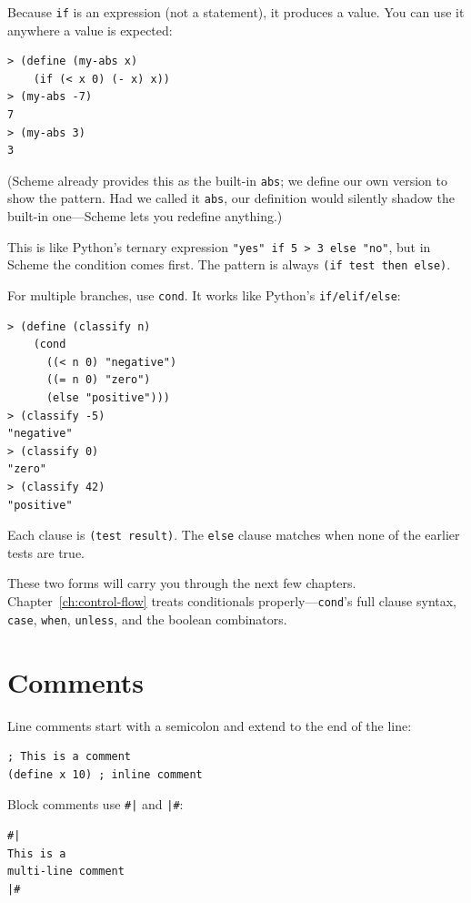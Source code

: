 Because \texttt{if} is an expression (not a statement), it produces a value. You can use it anywhere a value is expected:

\begin{lstlisting}[style=repl]
> (define (my-abs x)
    (if (< x 0) (- x) x))
> (my-abs -7)
7
> (my-abs 3)
3
\end{lstlisting}

(Scheme already provides this as the built-in \texttt{abs}; we define our own version to show the pattern. Had we called it \texttt{abs}, our definition would silently shadow the built-in one---Scheme lets you redefine anything.)

\begin{note}
This is like Python's ternary expression \texttt{"yes" if 5 > 3 else "no"}, but in Scheme the condition comes first. The pattern is always \texttt{(if test then else)}.
\end{note}

For multiple branches, use \texttt{cond}. It works like Python's \texttt{if/elif/else}:

\begin{lstlisting}[style=repl]
> (define (classify n)
    (cond
      ((< n 0) "negative")
      ((= n 0) "zero")
      (else "positive")))
> (classify -5)
"negative"
> (classify 0)
"zero"
> (classify 42)
"positive"
\end{lstlisting}

Each clause is \texttt{(test result)}. The \texttt{else} clause matches when none of the earlier tests are true.

These two forms will carry you through the next few chapters. Chapter~\ref{ch:control-flow} treats conditionals properly---\texttt{cond}'s full clause syntax, \texttt{case}, \texttt{when}, \texttt{unless}, and the boolean combinators.

\section{Comments}

Line comments start with a semicolon and extend to the end of the line:

\begin{lstlisting}
; This is a comment
(define x 10) ; inline comment
\end{lstlisting}

Block comments use \texttt{\#|} and \texttt{|\#}:

\begin{lstlisting}
#|
This is a
multi-line comment
|#
\end{lstlisting}

